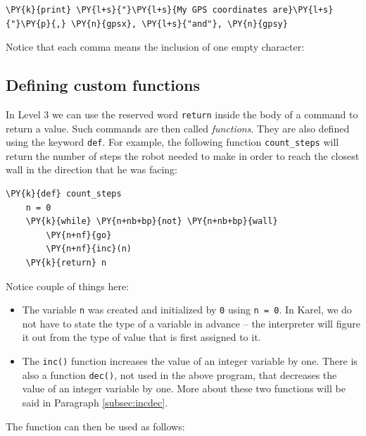 \begin{bbox}
\begin{Verbatim}[commandchars=\\\{\}]
\PY{k}{print} \PY{l+s}{"}\PY{l+s}{My GPS coordinates are}\PY{l+s}{"}\PY{p}{,} \PY{n}{gpsx}, \PY{l+s}{"and"}, \PY{n}{gpsy}
\end{Verbatim}
\end{bbox}
\vspace{6mm}

\noindent
Notice that each comma means the inclusion of one empty character:


\subsection[\ \ Defining custom functions]{Defining custom functions}

In Level 3 we can use the reserved word {\tt return} inside the body of
a command to return a value. Such commands are then called {\em functions}. 
They are also defined using the keyword {\tt def}. For example, the following function
{\tt count\_steps} will return the number of steps the robot needed to 
make in order to reach the closest wall in the direction that he was facing:\\

\begin{bbox}
\begin{Verbatim}[commandchars=\\\{\}]
\PY{k}{def} count_steps
    n = 0
    \PY{k}{while} \PY{n+nb+bp}{not} \PY{n+nb+bp}{wall}
        \PY{n+nf}{go}
        \PY{n+nf}{inc}(n)
    \PY{k}{return} n
\end{Verbatim}
\end{bbox}
\vspace{6mm}

\noindent
Notice couple of things here:
\begin{itemize}
\item The variable {\tt n} was created and initialized by {\tt 0} using {\tt n = 0}. In
      Karel, we do not have to state the type of a variable in advance -- the interpreter 
      will figure it out from the type of value that is first assigned to it.  
\item The {\tt inc()} function increases the value of an integer variable by one. 
      There is also a function {\tt dec()}, not used in the above program, that decreases 
      the value of an integer variable by one. More about these two functions will be said 
      in Paragraph \ref{subsec:incdec}.
\end{itemize}
The function can then be used as follows:\\

